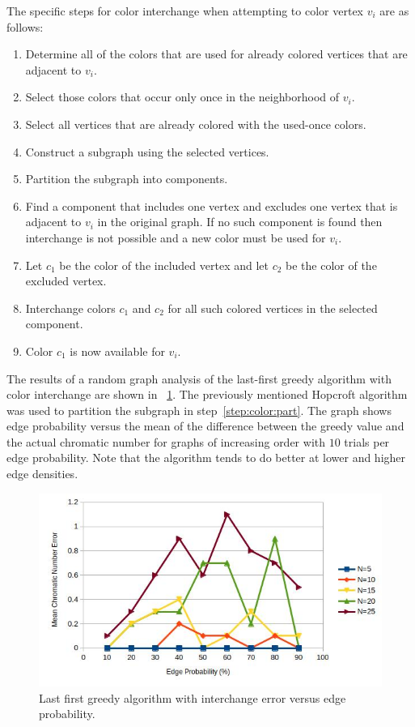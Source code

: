 The specific steps for color interchange when attempting to color vertex \(v_i\) are as follows:
\begin{enumerate}
\item Determine all of the colors that are used for already colored vertices that are adjacent to \(v_i\).
\item Select those colors that occur only once in the neighborhood of \(v_i\).
\item Select all vertices that are already colored with the used-once colors.
\item Construct a subgraph using the selected vertices.
\item\label{step:color:part} Partition the subgraph into components.
\item Find a component that includes one vertex and excludes one vertex that is adjacent to \(v_i\) in the original
  graph.  If no such component is found then interchange is not possible and a new color must be used for \(v_i\).
\item Let \(c_1\) be the color of the included vertex and let \(c_2\) be the color of the excluded vertex.
\item Interchange colors \(c_1\) and \(c_2\) for all such colored vertices in the selected component.
\item Color \(c_1\) is now available for \(v_i\).
\end{enumerate}

The results of a random graph analysis of the last-first greedy algorithm with color interchange are shown in
\figurename~\ref{fig:greedyerr}.  The previously mentioned Hopcroft algorithm~\cite{hopcroft} was used to partition
the subgraph in step~\ref{step:color:part}.  The graph shows edge probability versus the mean of the difference
between the greedy value and the actual chromatic number for graphs of increasing order with \(10\) trials per edge
probability.  Note that the algorithm tends to do better at lower and higher edge densities.

\begin{figure}[H]
  \centering
  \includegraphics[width=5in]{greedy_error}
  \caption{Last first greedy algorithm with interchange error versus edge probability.}
  \label{fig:greedyerr}
\end{figure}

